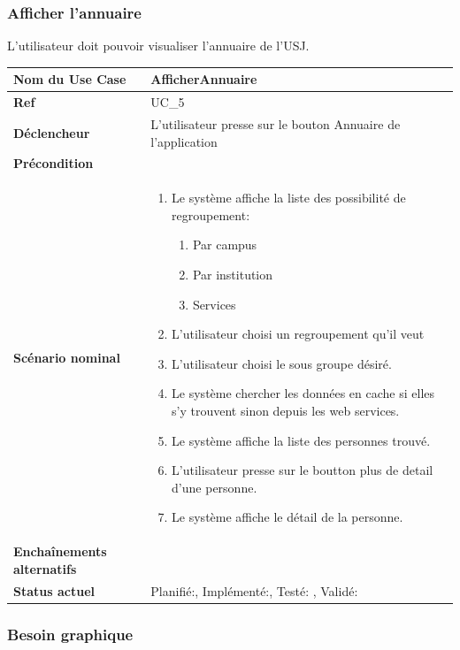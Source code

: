 			\subsubsection{Afficher l'annuaire}
					L'utilisateur doit pouvoir visualiser l'annuaire de l'USJ.\\[0.2cm]
					\begin{longtable}{|l|p{10cm}|}
						\hline \textbf{Nom du Use Case} & AfficherAnnuaire \\ 
						\hline \textbf{Ref} & UC\_5  \\ 
						\hline \textbf{Déclencheur} & L'utilisateur presse sur le bouton Annuaire  de l'application \\
						\hline \textbf{Précondition} &  \\
						\hline \textbf{Scénario nominal} & 
						\begin{enumerate}
							\item Le système affiche la liste des possibilité de regroupement:
								\begin{enumerate}
									\item Par campus
									\item Par institution
									\item Services
								\end{enumerate}
							\item L'utilisateur choisi un regroupement qu'il veut
							\item L'utilisateur choisi le sous groupe désiré.
							\item Le système chercher les données en cache si elles s'y trouvent sinon depuis les web services.
							\item Le système affiche la liste des personnes trouvé.
							\item L'utilisateur presse sur le boutton plus de detail d'une personne.
							\item Le système affiche le détail de la personne.
						\end{enumerate}
						\\ 
						\hline \textbf{Enchaînements alternatifs} & \\
						\hline \textbf{Status actuel} & Planifié:\CheckedBox , Implémenté:\CheckedBox  , Testé: \Square  , Validé: \CheckedBox  \\
						\hline 
					\end{longtable} 
			\subsubsection*{Besoin graphique}

